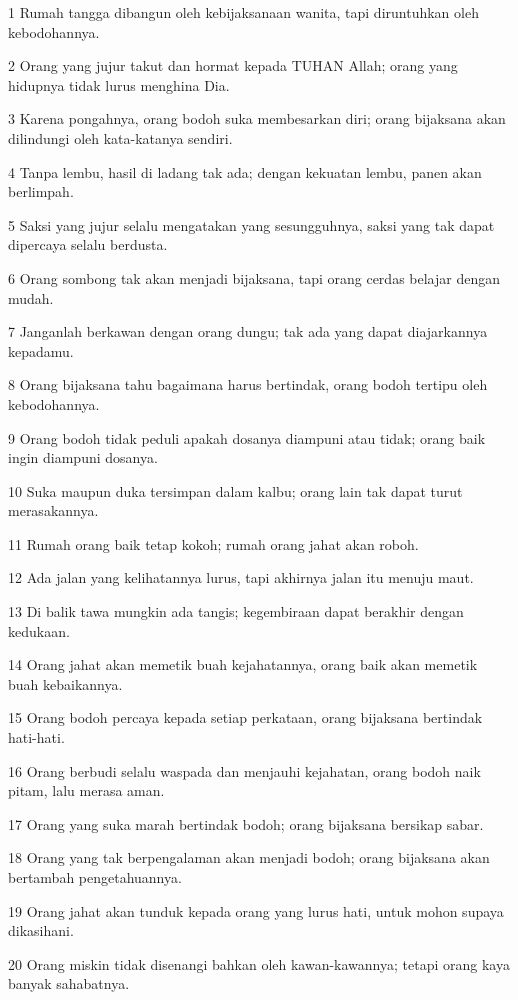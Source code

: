 \par 1 Rumah tangga dibangun oleh kebijaksanaan wanita, tapi diruntuhkan oleh kebodohannya.
\par 2 Orang yang jujur takut dan hormat kepada TUHAN Allah; orang yang hidupnya tidak lurus menghina Dia.
\par 3 Karena pongahnya, orang bodoh suka membesarkan diri; orang bijaksana akan dilindungi oleh kata-katanya sendiri.
\par 4 Tanpa lembu, hasil di ladang tak ada; dengan kekuatan lembu, panen akan berlimpah.
\par 5 Saksi yang jujur selalu mengatakan yang sesungguhnya, saksi yang tak dapat dipercaya selalu berdusta.
\par 6 Orang sombong tak akan menjadi bijaksana, tapi orang cerdas belajar dengan mudah.
\par 7 Janganlah berkawan dengan orang dungu; tak ada yang dapat diajarkannya kepadamu.
\par 8 Orang bijaksana tahu bagaimana harus bertindak, orang bodoh tertipu oleh kebodohannya.
\par 9 Orang bodoh tidak peduli apakah dosanya diampuni atau tidak; orang baik ingin diampuni dosanya.
\par 10 Suka maupun duka tersimpan dalam kalbu; orang lain tak dapat turut merasakannya.
\par 11 Rumah orang baik tetap kokoh; rumah orang jahat akan roboh.
\par 12 Ada jalan yang kelihatannya lurus, tapi akhirnya jalan itu menuju maut.
\par 13 Di balik tawa mungkin ada tangis; kegembiraan dapat berakhir dengan kedukaan.
\par 14 Orang jahat akan memetik buah kejahatannya, orang baik akan memetik buah kebaikannya.
\par 15 Orang bodoh percaya kepada setiap perkataan, orang bijaksana bertindak hati-hati.
\par 16 Orang berbudi selalu waspada dan menjauhi kejahatan, orang bodoh naik pitam, lalu merasa aman.
\par 17 Orang yang suka marah bertindak bodoh; orang bijaksana bersikap sabar.
\par 18 Orang yang tak berpengalaman akan menjadi bodoh; orang bijaksana akan bertambah pengetahuannya.
\par 19 Orang jahat akan tunduk kepada orang yang lurus hati, untuk mohon supaya dikasihani.
\par 20 Orang miskin tidak disenangi bahkan oleh kawan-kawannya; tetapi orang kaya banyak sahabatnya.

